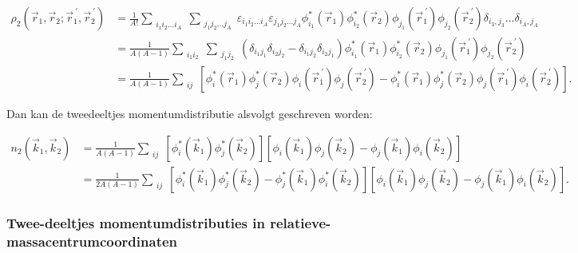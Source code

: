 \documentclass[12pt]{article}
\begin{document}
\begin{align}
\rho_2(\vec{r}_1,\vec{r}_2;\vec{r}^{\ \prime}_1,\vec{r}^{\ \prime}_2) 
&  = \frac{1}{A!} 	 \sum_{\substack{i_1 i_2 \ldots i_A}} \sum_{\substack{j_1j_2 \ldots j_A}} \varepsilon_{i_1 i_2 \ldots i_A} \varepsilon_{j_1j_2 \ldots j_A} \phi^*_{i_1}(\vec{r}_1)\phi^*_{i_2}(\vec{r}_2) \phi_{j_1}(\vec{r}_1^{\ \prime})\phi_{j_2}(\vec{r}_2^{\ \prime})
\delta_{i_3,j_3}...\delta_{i_A,j_A} \nonumber \\
&  = \frac{1}{A(A-1)} 	 \sum_{\substack{i_1 i_2}} \sum_{\substack{j_1j_2}} \left(\delta_{i_1j_1}\delta_{i_2j_2} - \delta_{i_1j_2}\delta_{i_2j_1} \right)
\phi^*_{i_1}(\vec{r}_1)\phi^*_{i_2}(\vec{r}_2) \phi_{j_1}(\vec{r}_1^{\ \prime})\phi_{j_2}(\vec{r}_2^{\ \prime}) \nonumber \\
& = \frac{1}{A(A-1)}\sum_{\substack{i j}} \left[\phi^*_{i}(\vec{r}_1)\phi^*_{j}(\vec{r}_2) \phi_{i}(\vec{r}_1^{\ \prime})\phi_{j}(\vec{r}_2^{\ \prime})  - \phi^*_{i}(\vec{r}_1)\phi^*_{j}(\vec{r}_2) \phi_{j}(\vec{r}_1^{\ \prime})\phi_{i}(\vec{r}_2^{\ \prime}) \right].
\end{align}

Dan kan de tweedeeltjes momentumdistributie alsvolgt geschreven worden:

\begin{align} \label{two-body}
n_2(\vec{k}_1,\vec{k}_2) & = \frac{1}{A(A-1)}\sum_{\substack{i j}} \left[\phi^*_{i}(\vec{k}_1)\phi^*_{j}(\vec{k}_2) \right] \left[ \phi_{i}(\vec{k}_1)\phi_{j}(\vec{k}_2)  - \phi_{j}(\vec{k}_1)\phi_{i}(\vec{k}_2) \right] \nonumber  \\
& = \frac{1}{2A(A-1)}\sum_{\substack{i j}} \left[\phi^*_{i}(\vec{k}_1)\phi^*_{j}(\vec{k}_2)- \phi^*_{j}(\vec{k}_1)\phi^*_{i}(\vec{k}_2) \right] \left[ \phi_{i}(\vec{k}_1)\phi_{j}(\vec{k}_2) - \phi_{j}(\vec{k}_1)\phi_{i}(\vec{k}_2) \right].
\end{align}

\subsubsection{Twee-deeltjes momentumdistributies in relatieve- massacentrumcoordinaten}
\end{document}
